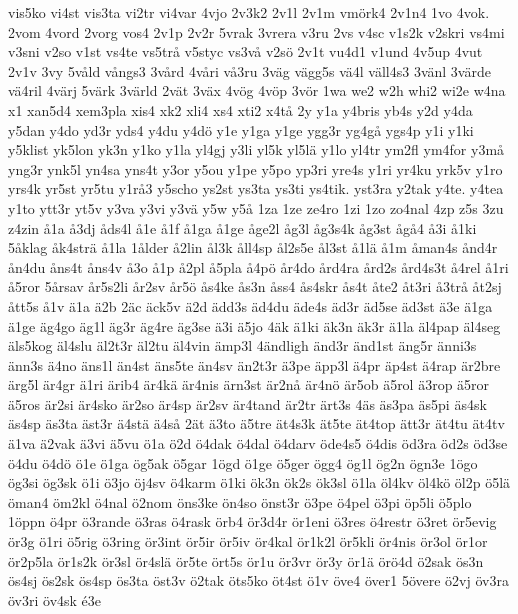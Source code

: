{{vis5ko
vi4st
vis3ta
vi2tr
vi4var
4vjo
2v3k2
2v1l
2v1m
vm^^f6rk4
2v1n4
1vo
4vok.
2vom
4vord
2vorg
vos4
2v1p
2v2r
5vrak
3vrera
v3ru
2vs
v4sc
v1s2k
v2skri
vs4mi
v3sni
v2so
v1st
vs4te
vs5tr^^e5
v5styc
vs3v^^e5
v2s^^f6
2v1t
vu4d1
v1und
4v5up
4vut
2v1v
3vy
5v^^e5ld
v^^e5ngs3
3v^^e5rd
4v^^e5ri
v^^e53ru
3v^^e4g
v^^e4gg5s
v^^e44l
v^^e4ll4s3
3v^^e4nl
3v^^e4rde
v^^e44ril
4v^^e4rj
5v^^e4rk
3v^^e4rld
2v^^e4t
3v^^e4x
4v^^f6g
4v^^f6p
3v^^f6r
1wa
we2
w2h
whi2
wi2e
w4na
x1
xan5d4
xem3pla
xis4
xk2
xli4
xs4
xti2
x4t^^e5
2y
y1a
y4bris
yb4s
y2d
y4da
y5dan
y4do
yd3r
yds4
y4du
y4d^^f6
y1e
y1ga
y1ge
ygg3r
yg4g^^e5
ygs4p
y1i
y1ki
y5klist
yk5lon
yk3n
y1ko
y1la
yl4gj
y3li
yl5k
yl5l^^e4
y1lo
yl4tr
ym2fl
ym4for
y3m^^e5
yng3r
ynk5l
yn4sa
yns4t
y3or
y5ou
y1pe
y5po
yp3ri
yre4s
y1ri
yr4ku
yrk5v
y1ro
yrs4k
yr5st
yr5tu
y1r^^e53
y5scho
ys2st
ys3ta
ys3ti
ys4tik.
yst3ra
y2tak
y4te.
y4tea
y1to
ytt3r
yt5v
y3va
y3vi
y3v^^e4
y5w
y5^^e5
1za
1ze
ze4ro
1zi
1zo
zo4nal
4zp
z5s
3zu
z4zin
^^e51a
^^e53dj
^^e5ds4l
^^e51e
^^e51f
^^e51ga
^^e51ge
^^e5ge2l
^^e5g3l
^^e5g3s4k
^^e5g3st
^^e5g^^e54
^^e53i
^^e51ki
5^^e5klag
^^e5k4str^^e4
^^e51la
1^^e5lder
^^e52lin
^^e5l3k
^^e5ll4sp
^^e5l2s5e
^^e5l3st
^^e51l^^e4
^^e51m
^^e5man4s
^^e5nd4r
^^e5n4du
^^e5ns4t
^^e5ns4v
^^e53o
^^e51p
^^e52pl
^^e55pla
^^e54p^^f6
^^e5r4do
^^e5rd4ra
^^e5rd2s
^^e5rd4s3t
^^e54rel
^^e51ri
^^e55ror
5^^e5rsav
^^e5r5s2li
^^e5r2sv
^^e5r5^^f6
^^e5s4ke
^^e5s3n
^^e5ss4
^^e5s4skr
^^e5s4t
^^e5te2
^^e5t3ri
^^e53tr^^e5
^^e5t2sj
^^e5tt5s
^^e51v
^^e41a
^^e42b
2^^e4c
^^e4ck5v
^^e42d
^^e4dd3s
^^e4d4du
^^e4de4s
^^e4d3r
^^e4d5se
^^e4d3st
^^e43e
^^e41ga
^^e41ge
^^e4g4go
^^e4g1l
^^e4g3r
^^e4g4re
^^e4g3se
^^e43i
^^e45jo
4^^e4k
^^e41ki
^^e4k3n
^^e4k3r
^^e41la
^^e4l4pap
^^e4l4seg
^^e4ls5kog
^^e4l4slu
^^e4l2t3r
^^e4l2tu
^^e4l4vin
^^e4mp3l
4^^e4ndligh
^^e4nd3r
^^e4nd1st
^^e4ng5r
^^e4nni3s
^^e4nn3s
^^e44no
^^e4ns1l
^^e4n4st
^^e4ns5te
^^e4n4sv
^^e4n2t3r
^^e43pe
^^e4pp3l
^^e44pr
^^e4p4st
^^e44rap
^^e4r2bre
^^e4rg5l
^^e4r4gr
^^e41ri
^^e4rib4
^^e4r4k^^e4
^^e4r4nis
^^e4rn3st
^^e4r2n^^e5
^^e4r4n^^f6
^^e4r5ob
^^e45rol
^^e43rop
^^e45ror
^^e45ros
^^e4r2si
^^e4r4sko
^^e4r2so
^^e4r4sp
^^e4r2sv
^^e4r4tand
^^e4r2tr
^^e4rt3s
4^^e4s
^^e4s3pa
^^e4s5pi
^^e4s4sk
^^e4s4sp
^^e4s3ta
^^e4st3r
^^e44st^^e4
^^e44s^^e5
2^^e4t
^^e43to
^^e45tre
^^e4t4s3k
^^e4t5te
^^e4t4top
^^e4tt3r
^^e4t4tu
^^e4t4tv
^^e41va
^^e42vak
^^e43vi
^^e45vu
^^f61a
^^f62d
^^f64dak
^^f64dal
^^f64darv
^^f6de4s5
^^f64dis
^^f6d3ra
^^f6d2s
^^f6d3se
^^f64du
^^f64d^^f6
^^f61e
^^f61ga
^^f6g5ak
^^f65gar
1^^f6gd
^^f61ge
^^f65ger
^^f6gg4
^^f6g1l
^^f6g2n
^^f6gn3e
1^^f6go
^^f6g3si
^^f6g3sk
^^f61i
^^f63jo
^^f6j4sv
^^f64karm
^^f61ki
^^f6k3n
^^f6k2s
^^f6k3sl
^^f61la
^^f6l4kv
^^f6l4k^^f6
^^f6l2p
^^f65l^^e4
^^f6man4
^^f6m2kl
^^f64nal
^^f62nom
^^f6ns3ke
^^f6n4so
^^f6nst3r
^^f63pe
^^f64pel
^^f63pi
^^f6p5li
^^f65plo
1^^f6ppn
^^f64pr
^^f63rande
^^f63ras
^^f64rask
^^f6rb4
^^f6r3d4r
^^f6r1eni
^^f63res
^^f64restr
^^f63ret
^^f6r5evig
^^f6r3g
^^f61ri
^^f65rig
^^f63ring
^^f6r3int
^^f6r5ir
^^f6r5iv
^^f6r4kal
^^f6r1k2l
^^f6r5kli
^^f6r4nis
^^f6r3ol
^^f6r1or
^^f6r2p5la
^^f6r1s2k
^^f6r3sl
^^f6r4sl^^e4
^^f6r5te
^^f6rt5s
^^f6r1u
^^f6r3vr
^^f6r3y
^^f6r1^^e4
^^f6r^^f64d
^^f62sak
^^f6s3n
^^f6s4sj
^^f6s2sk
^^f6s4sp
^^f6s3ta
^^f6st3v
^^f62tak
^^f6ts5ko
^^f6t4st
^^f61v
^^f6ve4
^^f6ver1
5^^f6vere
^^f62vj
^^f6v3ra
^^f6v3ri
^^f6v4sk
^^e93e
}
\hyphenation {
}

}

